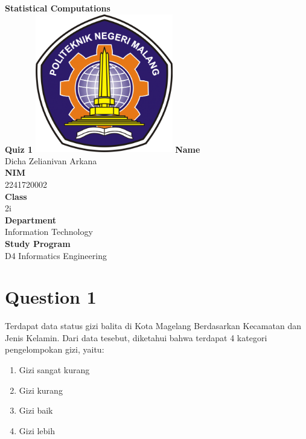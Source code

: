 \documentclass[12pt,titlepage]{article}
\newcommand{\vSubject}{Statistical Computations}
\newcommand{\vSubtitle}{Quiz 1}
\newcommand{\vName}{Dicha Zelianivan Arkana}
\newcommand{\vNIM}{2241720002}
\newcommand{\vClass}{2i}
\newcommand{\vDepartment}{Information Technology}
\newcommand{\vStudyProgram}{D4 Informatics Engineering}
\begin{document}
\begin{titlepage}
    \centering
    \vfill
    {\bfseries\LARGE
        \vSubject\\
        \vskip0.25cm
        \vSubtitle
    }
    \vfill
    \includegraphics[width=6cm]{images/polinema-logo.png}
    \vfill
    {
        \textbf{Name}\\
        \vName\\
        \vskip0.5cm
        \textbf{NIM}\\
        \vNIM\\
        \vskip0.5cm
        \textbf{Class}\\
        \vClass\\
        \vskip0.5cm
        \textbf{Department}\\
        \vDepartment\\
        \vskip0.5cm
        \textbf{Study Program}\\
        \vStudyProgram
    }
\end{titlepage}

\section{Question 1}

Terdapat data status gizi balita di Kota Magelang Berdasarkan Kecamatan dan Jenis Kelamin.
Dari data tesebut, diketahui bahwa terdapat 4 kategori pengelompokan gizi, yaitu:
\begin{enumerate}
    \item Gizi sangat kurang
    \item Gizi kurang
    \item Gizi baik
    \item Gizi lebih
\end{enumerate}
\end{document}
